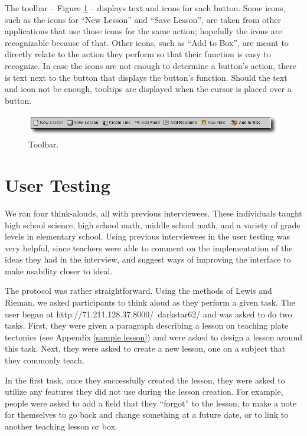 \documentclass[10pt,letter]{article}
\begin{document}
The toolbar -- Figure \ref{fig: toolbar ss} -- displays text and icons for each
button. Some icons, such as the icons for ``New Lesson'' and ``Save Lesson'',
are taken from other applications that use those icons for the same action;
hopefully the icons are recognizable because of that. Other icons, such as ``Add
to Box'', are meant to directly relate to the action they perform so that their
function is easy to recognize. In case the icons are not enough to determine a
button's action, there is text next to the button that displays the button's
function. Should the text and icon not be enough, tooltips are displayed when
the cursor is placed over a button.

\begin{figure}[htb]
	\centering
	\includegraphics[width=0.9\linewidth]{figures/toolbar}
	\caption{Toolbar.}
	\label{fig: toolbar ss}
\end{figure}

\section{User Testing}
We ran four think-alouds, all with previous interviewees.  These individuals
taught high school science, high school math, middle school math, and a variety
of grade levels in elementary school.  Using previous interviewees in the user
testing was very helpful, since teachers were able to comment on the
implementation of the ideas they had in the interview, and suggest ways of
improving the interface to make usability closer to ideal.

The protocol was rather straightforward. Using the methods of Lewis and Rieman,
we asked participants to think aloud as they perform a given task. The user
began at http://71.211.128.37:8000/~darkstar62/ and was asked to do two tasks.
First, they were given a paragraph describing a lesson on teaching plate
tectonics (see Appendix \ref{sample lesson}) and were asked to design a lesson
around this task.  Next, they were asked to create a new lesson, one on a
subject that they commonly teach.

In the first task, once they successfully created the lesson, they were asked to
utilize any features they did not use during the lesson creation. For example,
people were asked to add a field that they ``forgot'' to the lesson, to make a
note for themselves to go back and change something at a future date, or to link
to another teaching lesson or box.
\end{document}
